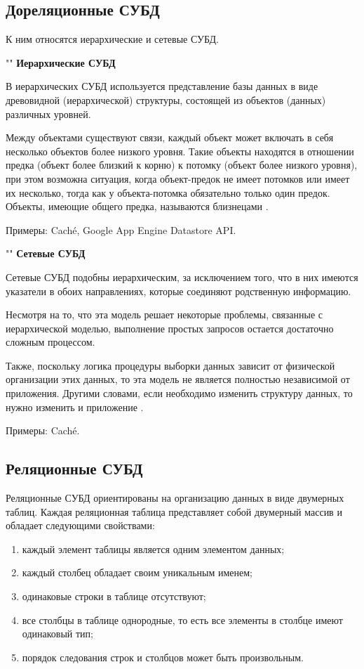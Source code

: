 \documentclass[a4paper,14pt]{extreport}
\begin{document}
\subsection*{Дореляционные СУБД}

К ним относятся иерархические и сетевые СУБД.

""\newline
\noindent\textbf{Иерархические СУБД}

В иерархических СУБД используется представление базы данных в виде древовидной (иерархической) структуры, состоящей из объектов (данных) различных уровней.

Между объектами существуют связи, каждый объект может включать в себя несколько объектов более низкого уровня. Такие объекты находятся в отношении предка (объект более близкий к корню) к потомку (объект более низкого уровня), при этом возможна ситуация, когда объект-предок не имеет потомков или имеет их несколько, тогда как у объекта-потомка обязательно только один предок. Объекты, имеющие общего предка, называются близнецами \cite{scienceforum}.

Примеры: Caché, Google App Engine Datastore API.

""\newline
\noindent\textbf{Сетевые СУБД}

Сетевые СУБД подобны иерархическим, за исключением того, что в них имеются указатели в обоих направлениях, которые соединяют родственную информацию.

Несмотря на то, что эта модель решает некоторые проблемы, связанные с иерархической моделью, выполнение простых запросов остается достаточно сложным процессом.

Также, поскольку логика процедуры выборки данных зависит от физической организации этих данных, то эта модель не является полностью независимой от приложения. Другими словами, если необходимо изменить структуру данных, то нужно изменить и приложение \cite{scienceforum}.

Примеры: Caché.

\subsection*{Реляционные СУБД}

Реляционные СУБД ориентированы на организацию данных в виде двумерных таблиц. Каждая реляционная таблица представляет собой двумерный массив и обладает следующими свойствами:

\begin{enumerate}
	\setlength\itemsep{0.01em}
	\item каждый элемент таблицы является одним элементом данных;
	\item каждый столбец обладает своим уникальным именем;
	\item одинаковые строки в таблице отсутствуют;
	\item все столбцы в таблице однородные, то есть все элементы в столбце имеют одинаковый тип;
	\item порядок следования строк и столбцов может быть произвольным.
\end{enumerate}
\end{document}
